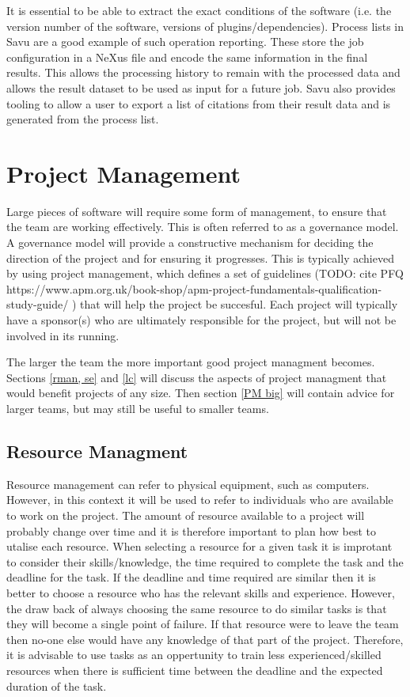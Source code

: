 \documentclass[jnr]{iosart2x}
\begin{document}
It is essential to be able to extract the exact conditions of the software (i.e. the version number of the software, versions of plugins/dependencies).
Process lists in Savu \cite{Wadeson_2016} are a good example of such operation reporting.
These store the job configuration in a NeXus file and encode the same information in the final results.
This allows the processing history to remain with the processed data and allows the result dataset to be used as input for a future job.
Savu also provides tooling to allow a user to export a list of citations from their result data and is generated from the process list.

\section{Project Management}
\label{Project Management}

Large pieces of software will require some form of management, to ensure that the team are working effectively.
This is often referred to as a governance model.
A governance model will provide a constructive mechanism for deciding the direction of the project and for ensuring it progresses.
This is typically achieved by using project management, which defines a set of guidelines (TODO: cite PFQ https://www.apm.org.uk/book-shop/apm-project-fundamentals-qualification-study-guide/ ) that will help the project be succesful.
Each project will typically have a sponsor(s) who are ultimately responsible for the project, but will not be involved in its running.

The larger the team the more important good project managment becomes.
Sections \ref{rman, se} and \ref{lc} will discuss the aspects of project managment that would benefit projects of any size.
Then section \ref{PM big} will contain advice for larger teams, but may still be useful to smaller teams.

\subsection{Resource Managment}\label{rman}
Resource management can refer to physical equipment, such as computers.
However, in this context it will be used to refer to individuals who are available to work on the project.
The amount of resource available to a project will probably change over time and it is therefore important to plan how best to utalise each resource.
When selecting a resource for a given task it is improtant to consider their skills/knowledge, the time required to complete the task and the deadline for the task.
If the deadline and time required are similar then it is better to choose a resource who has the relevant skills and experience.
However, the draw back of always choosing the same resource to do similar tasks is that they will become a single point of failure.
If that resource were to leave the team then no-one else would have any knowledge of that part of the project.
Therefore, it is advisable to use tasks as an oppertunity to train less experienced/skilled resources when there is sufficient time between the deadline and the expected duration of the task.
\end{document}
